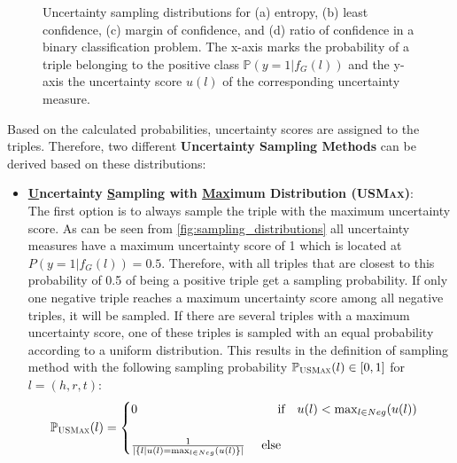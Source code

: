 \begin{figure}[H]
\begin{minipage}{.4\textwidth}
    \end{minipage}%
    \caption{Uncertainty sampling distributions for (a) entropy, (b) least confidence, (c) margin of confidence, and (d) ratio of confidence in a binary classification problem.
    The x-axis marks the probability of a triple belonging to the positive class $\mathbb{P}(y = 1 | f_G(l))$ and the y-axis the uncertainty score $u(l)$ of the corresponding uncertainty measure.}
    \label{fig:sampling_distributions}
\end{figure}

Based on the calculated probabilities, uncertainty scores are assigned to the triples.
Therefore, two different \textbf{Uncertainty Sampling Methods} can be derived based on these distributions:
\begin{itemize}
    \item 
    \textbf{\underline{U}ncertainty \underline{S}ampling with \underline{Max}imum Distribution (\textsc{USMax})}:\\
    The first option is to always sample the triple with the maximum uncertainty score.
    As can be seen from \autoref{fig:sampling_distributions} all uncertainty measures have a maximum uncertainty score of 1 which is located at $P(y = 1 | f_G(l)) = 0.5$.
    Therefore, with \usmax all triples that are closest to this probability of 0.5 of being a positive triple get a sampling probability.
    If only one negative triple reaches a maximum uncertainty score among all negative triples, it will be sampled.
    If there are several triples with a maximum uncertainty score, one of these triples is sampled with an equal probability according to a uniform distribution.
    This results in the definition of sampling method \usmax with the following sampling probability $\mathbb{P}_{\textsc{USMax}}(l) \in [0,1]$ for $l = (h,r,t)$:
    \begin{equation} 
        \mathbb{P}_{\usmax}(l) =
        \begin{cases}
             0 \ \ \ \ \ \ \ \ \ \ \ \ \ \  \ \ \ \ \ \ \ \ \ \ \ \ \ \ \ \ \ \ \ \ 
             \text{if}\ \ \ u(l) < \max_{l \in Neg}(u(l)) 
             \\ \\
            \frac{1}{|\{l | u(l) = \max_{l \in Neg}(u(l)\}|} 
            \ \ \ \
            \text{else} 
             \\
        \end{cases}
         \label{eq:usmax}
    \end{equation}
    

\end{itemize}
